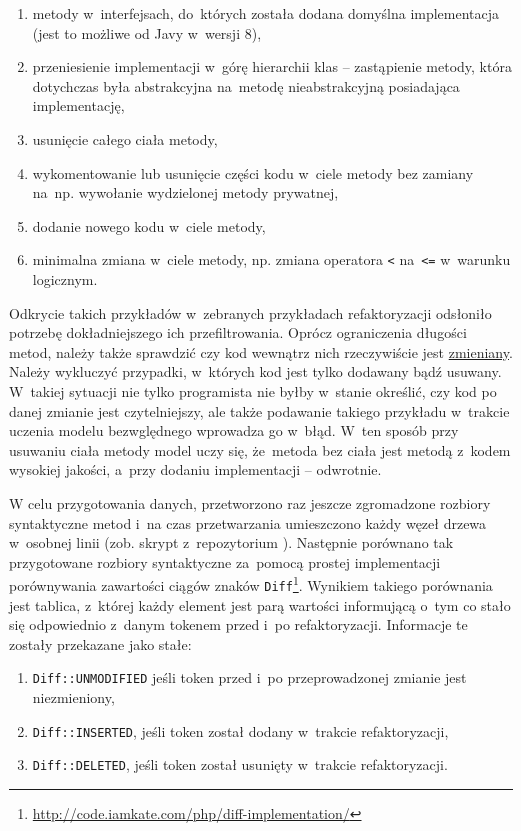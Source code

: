\documentclass[twoside]{praca}
\begin{document}
\begin{enumerate}
\item metody w~interfejsach, do~których została dodana domyślna implementacja (jest to możliwe od Javy w~wersji 8),
\item przeniesienie implementacji w~górę hierarchii klas -- zastąpienie metody, która dotychczas była abstrakcyjna na~metodę nieabstrakcyjną posiadająca implementację,
\item usunięcie całego ciała metody,
\item wykomentowanie lub usunięcie części kodu w~ciele metody bez zamiany na~np. wywołanie wydzielonej metody prywatnej,
\item dodanie nowego kodu w~ciele metody,
\item minimalna zmiana w~ciele metody, np. zmiana operatora \texttt{<} na~\texttt{<=} w~warunku logicznym.
\end{enumerate}

Odkrycie takich przykładów w~zebranych przykładach refaktoryzacji odsłoniło potrzebę dokładniejszego ich przefiltrowania. 
Oprócz ograniczenia długości metod, należy także sprawdzić czy kod wewnątrz nich rzeczywiście jest \underline{zmieniany}. Należy wykluczyć przypadki, w~których kod jest tylko dodawany bądź usuwany. W~takiej sytuacji nie tylko programista nie byłby w~stanie określić, czy kod po danej zmianie jest czytelniejszy, ale także podawanie takiego przykładu w~trakcie uczenia modelu bezwględnego wprowadza go w~błąd. W~ten sposób przy usuwaniu ciała metody model uczy się, że~metoda bez ciała jest metodą z~kodem wysokiej jakości, a~przy dodaniu implementacji -- odwrotnie.

W celu przygotowania danych, przetworzono raz jeszcze zgromadzone rozbiory syntaktyczne metod i~na czas przetwarzania umieszczono każdy węzeł drzewa w~osobnej linii (zob. skrypt  z~repozytorium \cite{fracz:refactor-extractor}). Następnie porównano tak przygotowane rozbiory syntaktyczne za~pomocą prostej implementacji porównywania zawartości ciągów znaków \texttt{Diff}\footnote{\url{http://code.iamkate.com/php/diff-implementation/}}. Wynikiem takiego porównania jest tablica, z~której każdy element jest parą wartości informującą o~tym co stało się odpowiednio z~danym tokenem przed i~po refaktoryzacji. Informacje te zostały przekazane jako stałe:

\begin{enumerate}
\item \texttt{Diff::UNMODIFIED} jeśli token przed i~po przeprowadzonej zmianie jest niezmieniony,
\item \texttt{Diff::INSERTED}, jeśli token został dodany w~trakcie refaktoryzacji,
\item \texttt{Diff::DELETED}, jeśli token został usunięty w~trakcie refaktoryzacji.
\end{enumerate}
\end{document}
